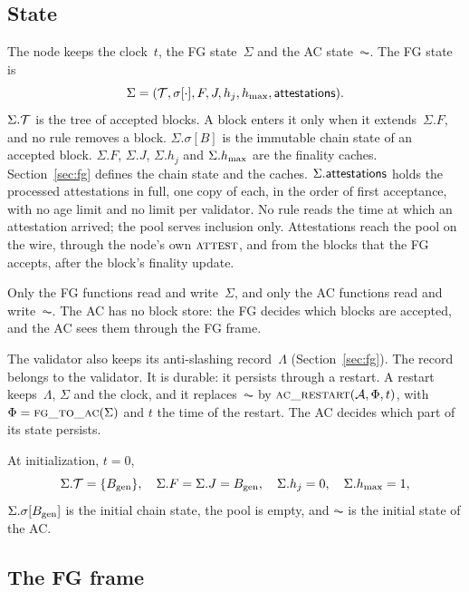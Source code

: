 \subsection{State}\label{sec:store}

The node keeps the clock~$t$, the FG state~$\Sigma$ and the AC
state~$\AC$.  The FG state is
\[
 \Sigma=(\mathcal T,\sigma[\cdot],F,J,h_j,h_{\max},\mathsf{attestations}).
\]
$\Sigma.\mathcal T$ is the tree of accepted blocks.  A block enters it only when
it extends~$\Sigma.F$, and no rule removes a block.
$\Sigma.\sigma[B]$ is the immutable chain state of an accepted
block.  $\Sigma.F$, $\Sigma.J$, $\Sigma.h_j$ and $\Sigma.h_{\max}$ are the
finality caches.  Section~\ref{sec:fg} defines the chain state and the
caches.  $\Sigma.\mathsf{attestations}$ holds
the processed attestations in full, one copy of each, in the order of
first acceptance, with no age limit and no limit per validator.  No rule
reads the time at which an attestation arrived; the pool serves inclusion
only.  Attestations reach the pool on the wire, through the node's own
$\Call{attest}{}$, and from the blocks that the FG accepts, after the
block's finality update.

Only the FG functions read and write~$\Sigma$, and only the AC functions
read and write~$\AC$.  The AC has no block store: the FG decides which
blocks are accepted, and the AC sees them through the FG frame.

The validator also keeps its anti-slashing record~$\Lambda$
(Section~\ref{sec:fg}).  The record belongs to the validator.  It is
durable: it persists through a restart.  A restart keeps~$\Lambda$,
$\Sigma$ and the clock, and it replaces~$\AC$ by
$\Call{ac\_restart}{\AC,\Fr,t}$, with $\Fr=\Call{fg\_to\_ac}{\Sigma}$
and $t$ the time of the restart.  The AC decides which part of its state
persists.

At initialization, $t=0$,
\[
 \Sigma.\mathcal T=\{B_{\mathrm{gen}}\},\quad
 \Sigma.F=\Sigma.J=B_{\mathrm{gen}},\quad \Sigma.h_j=0,\quad \Sigma.h_{\max}=1,
\]
$\Sigma.\sigma[B_{\mathrm{gen}}]$ is the initial chain state, the pool is empty,
and $\AC$ is the initial state of the AC.

\subsection{The FG frame}\label{sec:frame}

